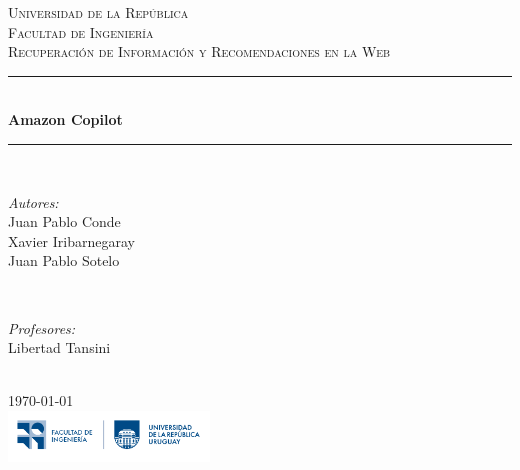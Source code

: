 \documentclass[12pt]{article}
\begin{document}
\begin{titlepage}

    \center

    \textsc{\LARGE Universidad de la República}\\[1.5cm]
    \textsc{\Large Facultad de Ingeniería}\\[1.0cm]
    \textsc{\large Recuperación de Información y Recomendaciones en la Web}\\[0.5cm]

    \rule{\linewidth}{0.5mm} \\[1cm]
    {\huge \bfseries Amazon Copilot}\\[0.5cm]
    \rule{\linewidth}{0.5mm} \\[1.5cm]

    \begin{minipage}{0.4\textwidth}
        \begin{flushleft} \large
            \emph{Autores:}\\
            Juan Pablo Conde\\
            Xavier Iribarnegaray\\
            Juan Pablo Sotelo\\
        \end{flushleft}
    \end{minipage}
    ~
    \begin{minipage}{0.4\textwidth}
        \begin{flushright} \large
            \emph{Profesores:} \\
            Libertad Tansini \\
        \end{flushright}
    \end{minipage}\\[2cm]

    {\large \today}\\[1.5cm]

    \includegraphics[width=0.4\textwidth]{fing-logo}\\[1cm]

    \vfill

\end{titlepage}


\tableofcontents

\newpage
\end{document}
